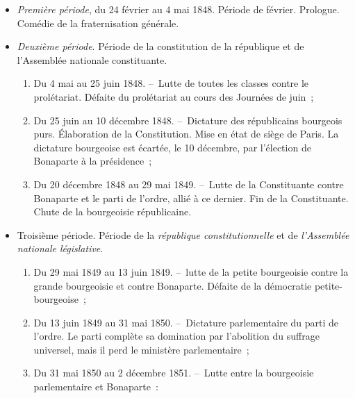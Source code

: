 \documentclass[french,twoside]{book} %
\begin{document}
\begin{itemize}[itemsep=\baselineskip,]
\item \emph{Première période}, du 24 février au 4 mai 1848. Période de février. Prologue. Comédie de la fraternisation générale.
\item  \emph{Deuxième période}. Période de la constitution de la république et de l’Assemblée nationale constituante.\par
 
\begin{enumerate}[itemsep=0pt,]
\item Du 4 mai au 25 juin 1848. – Lutte de toutes les classes contre le prolétariat. Défaite du prolétariat au cours des Journées de juin ;
\item Du 25 juin au 10 décembre 1848. – Dictature des républicains bourgeois purs. Élaboration de la Constitution. Mise en état de siège de Paris. La dictature bourgeoise est écartée, le 10 décembre, par l’élection de Bonaparte à la présidence ;
\item Du 20 décembre 1848 au 29 mai 1849. – Lutte de la Constituante contre Bonaparte et le parti de l’ordre, allié à ce dernier. Fin de la Constituante. Chute de la bourgeoisie républicaine.
\end{enumerate}


\item  Troisième période. Période de la \emph{république constitutionnelle} et de \emph{l’Assemblée nationale législative}.\par
 
\begin{enumerate}[itemsep=\baselineskip,]
\item Du 29 mai 1849 au 13 juin 1849. – lutte de la petite bourgeoisie contre la grande bourgeoisie et contre Bonaparte. Défaite de la démocratie petite-bourgeoise ;
\item Du 13 juin 1849 au 31 mai 1850. – Dictature parlementaire du parti de l’ordre. Le parti complète sa domination par l’abolition du suffrage universel, mais il perd le ministère parlementaire ;
\item  Du 31 mai 1850 au 2 décembre 1851. – Lutte entre la bourgeoisie parlementaire et Bonaparte :\par
 

\end{enumerate}
\end{itemize}
\end{document}
